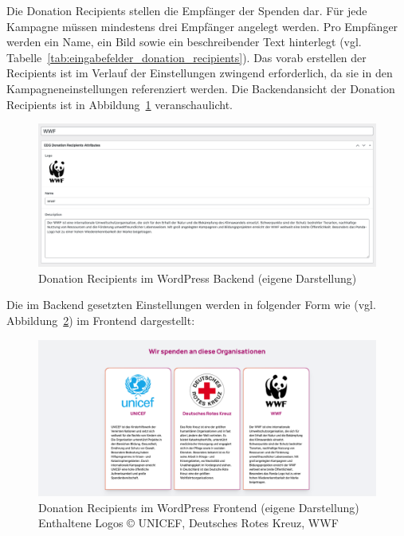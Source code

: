 Die Donation Recipients stellen die Empfänger der Spenden dar.
Für jede Kampagne müssen mindestens drei Empfänger angelegt werden.
Pro Empfänger werden ein Name, ein Bild sowie ein beschreibender Text hinterlegt (vgl. Tabelle~\ref{tab:eingabefelder_donation_recipients}).
Das vorab erstellen der Recipients ist im Verlauf der Einstellungen zwingend erforderlich, da sie in den Kampagneneinstellungen referenziert werden.
Die Backendansicht der Donation Recipients ist in Abbildung~\ref{fig:donation-recipients-settings-legacy} veranschaulicht.
\begin{figure}[H]
    \centering
    \includegraphics[width=1\textwidth]{images/legacy_donation_recipients_backend}
    \caption{Donation Recipients im WordPress Backend (eigene Darstellung)}
    \label{fig:donation-recipients-settings-legacy}
\end{figure}
Die im Backend gesetzten Einstellungen werden in folgender Form wie (vgl. Abbildung~\ref{fig:donation-recipients-frontend-legacy}) im Frontend dargestellt:
\begin{figure}[H]
    \centering
    \includegraphics[width=1\textwidth]{images/legacy_donation_recipients_frontend}
    \caption{Donation Recipients im WordPress Frontend (eigene Darstellung)\\Enthaltene Logos © UNICEF, Deutsches Rotes Kreuz, WWF \cite{ngo_logos}}
    \label{fig:donation-recipients-frontend-legacy}
\end{figure}

